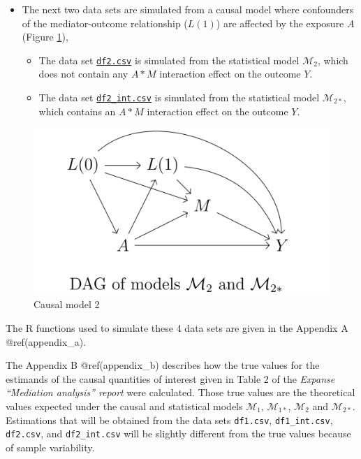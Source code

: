 \documentclass[
]{book}
\providecommand{\tightlist}{%
  \setlength{\itemsep}{0pt}\setlength{\parskip}{0pt}}
\begin{document}
\begin{itemize}
\tightlist
\item
  The next two data sets are simulated from a causal model where confounders of the mediator-outcome relationship (\(L(1)\)) are affected by the exposure \(A\) (Figure \ref{fig:figDAGM2}),

  \begin{itemize}
  \tightlist
  \item
    The data set \href{https://github.com/benoitlepage/mediation_workshop/blob/main/data/df2.csv}{\texttt{df2.csv}} is simulated from the statistical model \(\mathcal{M}_2\), which does not contain any \(A \ast M\) interaction effect on the outcome \(Y\).
  \item
    The data set \href{https://github.com/benoitlepage/mediation_workshop/blob/main/data/df2_int.csv}{\texttt{df2\_int.csv}} is simulated from the statistical model \(\mathcal{M}_{2 \ast}\), which contains an \(A \ast M\) interaction effect on the outcome \(Y\).
  \end{itemize}
\end{itemize}

\begin{figure}

{\centering \includegraphics[width=0.5\linewidth]{./figures/DAG_M2} 

}

\caption{Causal model 2}\label{fig:figDAGM2}
\end{figure}

The R functions used to simulate these 4 data sets are given in the Appendix A @ref(appendix\_a).

The Appendix B @ref(appendix\_b) describes how the true values for the estimands of the causal quantities of interest given in Table 2 of the \emph{Expanse ``Mediation analysis'' report} were calculated. Those true values are the theoretical values expected under the causal and statistical models \(\mathcal{M}_1\), \(\mathcal{M}_{1 \ast}\), \(\mathcal{M}_2\) and \(\mathcal{M}_{2 \ast}\). Estimations that will be obtained from the data sets \texttt{df1.csv}, \texttt{df1\_int.csv}, \texttt{df2.csv}, and \texttt{df2\_int.csv} will be slightly different from the true values because of sample variability.
\end{document}
